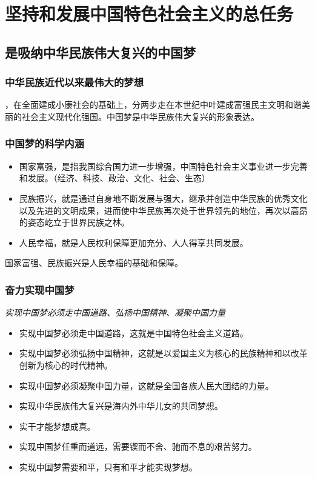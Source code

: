\chapter{坚持和发展中国特色社会主义的总任务}

\section{是吸纳中华民族伟大复兴的中国梦}
    \subsection{中华民族近代以来最伟大的梦想}
        ，在全面建成小康社会的基础上，分两步走在本世纪中叶建成富强民主文明和谐美丽的社会主义现代化强国。中国梦是中华民族伟大复兴的形象表达。

    \subsection{中国梦的科学内涵}
        \begin{itemize}
            \item 国家富强，是指我国综合国力进一步增强，中国特色社会主义事业进一步完善和发展。（经济、科技、政治、文化、社会、生态）
            \item 民族振兴，就是通过自身地不断发展与强大，继承并创造中华民族的优秀文化以及先进的文明成果，进而使中华民族再次处于世界领先的地位，再次以高昂的姿态屹立于世界民族之林。
            \item 人民幸福，就是人民权利保障更加充分、人人得享共同发展。
        \end{itemize}

        国家富强、民族振兴是人民幸福的基础和保障。

    \subsection{奋力实现中国梦}
        \emph{实现中国梦必须走中国道路、弘扬中国精神、凝聚中国力量}
        \begin{itemize}
            \item 实现中国梦必须走中国道路，这就是中国特色社会主义道路。
            \item 实现中国梦必须弘扬中国精神，这就是以爱国主义为核心的民族精神和以改革创新为核心的时代精神。
            \item 实现中国梦必须凝聚中国力量，这就是全国各族人民大团结的力量。
            \item 实现中华民族伟大复兴是海内外中华儿女的共同梦想。
            \item 实干才能梦想成真。
            \item 实现中国梦任重而道远，需要锲而不舍、驰而不息的艰苦努力。
            \item 实现中国梦需要和平，只有和平才能实现梦想。
        \end{itemize}


